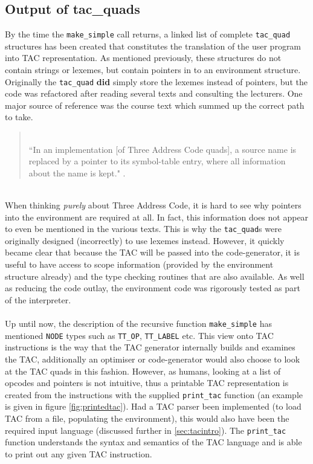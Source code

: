 \subsection{Output of tac\_quads}
By the time the \verb!make_simple! call returns, a linked list of complete \verb!tac_quad! structures has been created that constitutes the translation of the user \mmc program into TAC representation. As mentioned previously, these structures do not contain strings or lexemes, but contain pointers in to an environment structure. Originally the \verb!tac_quad! \textbf{did} simply store the lexemes instead of pointers, but the code was refactored after reading several texts and consulting the lecturers. One major source of reference was the course text which summed up the correct path to take.
\begin{quotation}
	\ \\
	``In an implementation [of Three Address Code quads], a source name is replaced by a pointer to its symbol-table entry, where all information about the name is kept." \cite{aho2007}.
\end{quotation}
\ \\
When thinking \emph{purely} about Three Address Code, it is hard to see why pointers into the environment are required at all. In fact, this information does not appear to even be mentioned in the various texts. This is why the \verb!tac_quad!s were originally designed (incorrectly) to use lexemes instead. However, it quickly became clear that because the TAC will be passed into the code-generator, it is useful to have access to scope information (provided by the environment structure already) and the type checking routines that are also available. As well as reducing the code outlay, the environment code was rigorously tested as part of the interpreter.
\ \\ \ \\
Up until now, the description of the recursive function \verb!make_simple! has mentioned \verb!NODE! types such as \verb!TT_OP!, \verb!TT_LABEL! etc. This view onto TAC instructions is the way that the TAC generator internally builds and examines the TAC, additionally an optimiser or code-generator would also choose to look at the TAC quads in this fashion. However, as humans, looking at a list of opcodes and pointers is not intuitive, thus a printable TAC representation is created from the instructions with the supplied \verb!print_tac! function (an example is given in figure \ref{fig:printedtac}). Had a TAC parser been implemented (to load TAC from a file, populating the environment), this would also have been the required input language (discussed further in \ref{sec:tacintro}). The \verb!print_tac! function understands the syntax and semantics of the TAC language and is able to print out any given TAC instruction.
